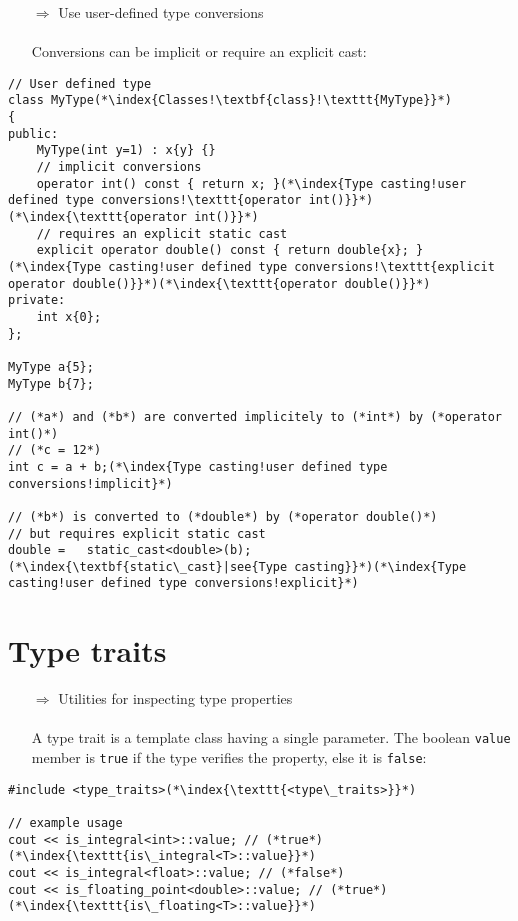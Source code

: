 \documentclass[10pt]{article}
\begin{document}
\begin{enumerate}
\item[$\Rightarrow$] Use user-defined type conversions\\ \\ Conversions can be implicit or require an explicit cast:
\end{enumerate}
\begin{lstlisting}
// User defined type
class MyType(*\index{Classes!\textbf{class}!\texttt{MyType}}*)
{
public:
    MyType(int y=1) : x{y} {}
    // implicit conversions
    operator int() const { return x; }(*\index{Type casting!user defined type conversions!\texttt{operator int()}}*)(*\index{\texttt{operator int()}}*)
    // requires an explicit static cast
    explicit operator double() const { return double{x}; }(*\index{Type casting!user defined type conversions!\texttt{explicit operator double()}}*)(*\index{\texttt{operator double()}}*)
private:
    int x{0};
};

MyType a{5};
MyType b{7};

// (*a*) and (*b*) are converted implicitely to (*int*) by (*operator int()*)
// (*c = 12*)
int c = a + b;(*\index{Type casting!user defined type conversions!implicit}*)

// (*b*) is converted to (*double*) by (*operator double()*)
// but requires explicit static cast
double =   static_cast<double>(b);(*\index{\textbf{static\_cast}|see{Type casting}}*)(*\index{Type casting!user defined type conversions!explicit}*)
\end{lstlisting}
%
%
\section{Type traits}
\small
\begin{enumerate}
\item[$\Rightarrow$] Utilities for inspecting type properties \\ \\A type trait is a template class having a single parameter. The boolean \texttt{value} member is \texttt{true} if the type verifies the property, else it is \texttt{false}:
\end{enumerate}
\begin{lstlisting}
#include <type_traits>(*\index{\texttt{<type\_traits>}}*)

// example usage
cout << is_integral<int>::value; // (*true*)(*\index{\texttt{is\_integral<T>::value}}*)
cout << is_integral<float>::value; // (*false*)
cout << is_floating_point<double>::value; // (*true*)(*\index{\texttt{is\_floating<T>::value}}*)
\end{lstlisting}
%
%
\end{document}
